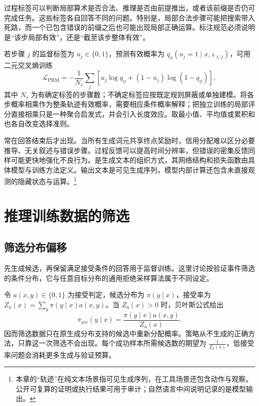 \documentclass[../textbook.tex]{subfiles}
\begin{document}
过程标签可以判断局部算术是否合法、推理是否由前提推出，或者该前缀是否仍可完成任务。这些标签各自回答不同的问题。特别是，局部合法步骤可能把搜索带入死路，而一个已包含错误的前缀之后也可能出现局部正确运算。标注规范必须说明是“该步局部有效”，还是“截至该步整体有效”。

若步骤 $j$ 的监督标签为 $u_j\in\{0,1\}$，预测有效概率为 $q_\phi(u_j=1\mid x,z_{\leq j})$，可用二元交叉熵训练
\begin{equation}
 \mathcal L_{\mathrm{PRM}}=-\frac1{N_s}\sum_j
 [u_j\log q_\phi+(1-u_j)\log(1-q_\phi)],
\end{equation}
其中 $N_s$ 为有确定标签的步骤数；不确定标签应按既定规则屏蔽或单独建模。将各步概率相乘作为整条轨迹有效概率，需要相应条件概率解释；把独立训练的局部评分直接相乘只是一种聚合启发式，并会引入长度效应。取最小值、平均值或累积和也各自改变选择准则。

常在回答结束后才出现。当所有生成词元共享终点奖励时，信用分配难以区分必要推导、无关叙述与错误步骤。过程反馈可以提高时间分辨率，但错误的密集反馈同样可能更快地强化不良行为。是生成文本的组织方式，其网络结构和损失函数由具体模型与训练方法定义。输出文本是可见生成序列，模型内部计算还包含未直接观测的隐藏状态与运算。\footnote{本章的“轨迹”在纯文本场景指可见生成序列，在工具场景还包含动作与观察。公开可复算的证明或执行结果可用于审计；自然语言中间说明记录的是模型输出。}

\section{推理训练数据的筛选}

\subsection{筛选分布偏移}
先生成候选，再保留满足接受条件的回答用于监督训练。这里讨论按验证事件筛选的条件分布，它与任意目标分布的通用拒绝采样算法属于不同设定。

令 $a(x,y)\in\{0,1\}$ 为接受判定，候选分布为 $\pi(y\mid x)$，接受率为 $Z_a(x)=\sum_y\pi(y\mid x)a(x,y)$。当 $Z_a(x)>0$ 时，贝叶斯公式给出
\begin{equation}
 \pi_{\mathrm{acc}}(y\mid x)=\frac{\pi(y\mid x)a(x,y)}{Z_a(x)}.
 \label{eq:reason-accepted}
\end{equation}
因而筛选数据只在原生成分布支持的候选中重新分配概率。策略从不生成的正确方法，只靠这一次筛选不会出现。每个成功样本所需候选数的期望为 $\frac{1}{Z_a(x)}$，低接受率问题会消耗更多生成与验证预算。
\end{document}

